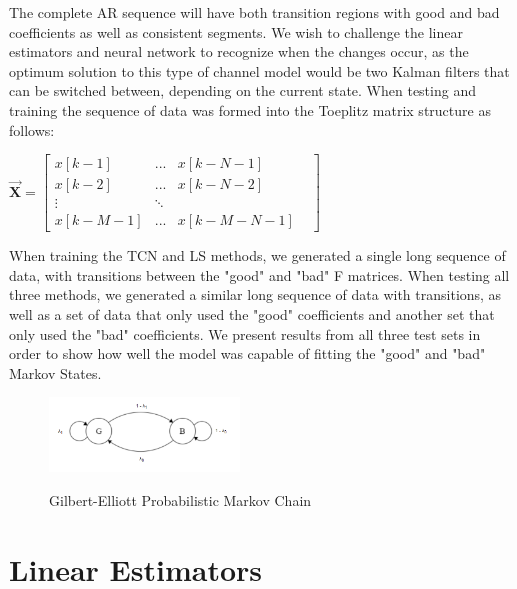 \documentclass[twocolumn,letterpaper]{IEEEAerospaceCLS}  %
\begin{document}
The complete AR sequence will have both transition regions with good and bad coefficients as well as consistent segments. We wish to challenge the linear estimators and neural network to recognize when the changes occur, as the optimum solution to this type of channel model would be two Kalman filters that can be switched between, depending on the current state. 
When testing and training the sequence of data was formed into the Toeplitz matrix structure as follows:


$\vec{\textbf{X}} = \begin{bmatrix}
x[k-1]   & ...       & x[k-N-1]     & \\
x[k-2]   & ...       & x[k-N-2]     & \\
\vdots             &  \ddots   &              & \\
x[k-M-1] & ...       & x[k-M-N-1]  
\end{bmatrix}$

When training the TCN and LS methods, we generated a single long sequence of data, with transitions between the "good" and "bad" F matrices. When testing all three methods, we generated a similar long sequence of data with transitions, as well as a set of data that only used the "good" coefficients and another set that only used the "bad" coefficients. We present results from all three test sets in order to show how well the model was capable of fitting the "good" and "bad" Markov States.

\begin{figure}[!h]
\centering\includegraphics[width=0.45\textwidth]{figs/GBmodel.PNG}\\
\caption{Gilbert-Elliott Probabilistic Markov Chain}
\label{gbe}
\end{figure}

\section{Linear Estimators}
\label{sec:linest}
\end{document}
